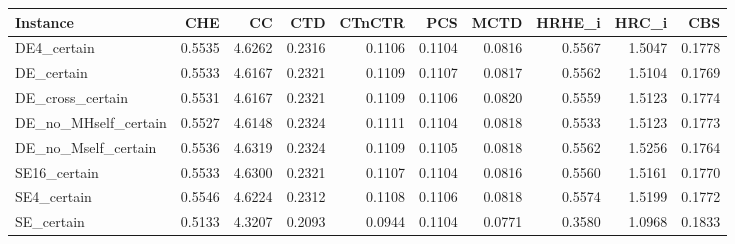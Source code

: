 \begin{tabular}{lrrrrrrrrr}
\toprule
Instance & CHE & CC & CTD & CTnCTR & PCS & MCTD & HRHE_i & HRC_i & CBS \\
\midrule
DE4_certain & 0.5535 & 4.6262 & 0.2316 & 0.1106 & 0.1104 & 0.0816 & 0.5567 & 1.5047 & 0.1778 \\
DE_certain & 0.5533 & 4.6167 & 0.2321 & 0.1109 & 0.1107 & 0.0817 & 0.5562 & 1.5104 & 0.1769 \\
DE_cross_certain & 0.5531 & 4.6167 & 0.2321 & 0.1109 & 0.1106 & 0.0820 & 0.5559 & 1.5123 & 0.1774 \\
DE_no_MHself_certain & 0.5527 & 4.6148 & 0.2324 & 0.1111 & 0.1104 & 0.0818 & 0.5533 & 1.5123 & 0.1773 \\
DE_no_Mself_certain & 0.5536 & 4.6319 & 0.2324 & 0.1109 & 0.1105 & 0.0818 & 0.5562 & 1.5256 & 0.1764 \\
SE16_certain & 0.5533 & 4.6300 & 0.2321 & 0.1107 & 0.1104 & 0.0816 & 0.5560 & 1.5161 & 0.1770 \\
SE4_certain & 0.5546 & 4.6224 & 0.2312 & 0.1108 & 0.1106 & 0.0818 & 0.5574 & 1.5199 & 0.1772 \\
SE_certain & 0.5133 & 4.3207 & 0.2093 & 0.0944 & 0.1104 & 0.0771 & 0.3580 & 1.0968 & 0.1833 \\
\bottomrule
\end{tabular}
